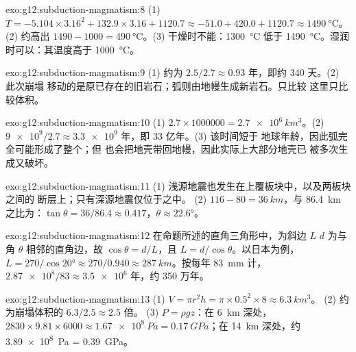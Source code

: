 \begin{solution}{exo:g12:subduction-magmatism:8}
(1) $T = -5.104 \times 3.16^2 + 132.9 \times 3.16 + 1120.7 \approx -51.0 +
420.0 + 1120.7 \approx \qty{1490}{\celsius}$。(2) 约高出 $1490 - 1000 =
\qty{490}{\celsius}$。(3) 干燥时不能：\qty{1300}{\celsius} 低于
\qty{1490}{\celsius}。湿润时可以：其温度高于 \qty{1000}{\celsius}。
\end{solution}

\begin{solution}{exo:g12:subduction-magmatism:9}
(1) 约为 $2.5/2.7 \approx 0.93$ 年，即约 340 天。(2) 此次崩塌
移动的是原已存在的旧岩石；弧则由地幔生成新岩石。只比较
这里只比较体积。
\end{solution}

\begin{solution}{exo:g12:subduction-magmatism:10}
(1) $2.7 \times \num{1000000} = \qty{2.7e6}{km^3}$。(2) $\num{9e9}/2.7
\approx \num{3.3e9}$ 年，即 33 亿年。(3) 该时间短于
地球年龄，因此弧完全可能形成了整个；但
也会把地壳带回地幔，因此实际上大部分地壳已
被多次生成又破坏。
\end{solution}

\begin{solution}{exo:g12:subduction-magmatism:11}
(1) 浅源地震也发生在上覆板块中，以及两板块之间的
断层上；只有深源地震仅位于之中。
(2) $116 - 80 = \qty{36}{km}$，与 \qty{86.4}{km} 之比为：$\tan\theta = 36/86.4
\approx 0.417$，$\theta \approx \ang{22.6}$。
\end{solution}

\begin{solution}{exo:g12:subduction-magmatism:12}
在命题所述的直角三角形中，为斜边 $L$
$d$ 为与角 $\theta$ 相邻的直角边，故 $\cos\theta = d/L$，且 $L =
d/\cos\theta$。以日本为例，$L = 270/\cos\ang{20} \approx 270/0.940 \approx
\qty{287}{km}$。按每年 \qty{83}{mm} 计，$\num{2.87e8}/83 \approx \num{3.5e6}$
年，约 350 万年。
\end{solution}

\begin{solution}{exo:g12:subduction-magmatism:13}
(1) $V = \pi r^2 h = \pi \times 0.5^2 \times 8 \approx \qty{6.3}{km^3}$。
(2) 约为崩塌体积的 $6.3/2.5 \approx 2.5$ 倍。
(3) $P = \rho g z$：在 \qty{6}{km} 深处，$2830 \times 9.81 \times 6000 \approx
\qty{1.67e8}{Pa} = \qty{0.17}{GPa}$；在 \qty{14}{km} 深处，约
\qty{3.89e8}{Pa} = \qty{0.39}{GPa}。
\end{solution}

